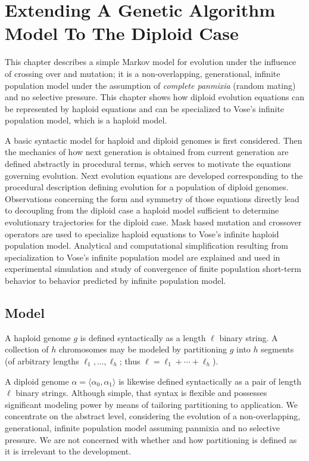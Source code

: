 \chapter{Extending A Genetic Algorithm Model To The Diploid Case} \label{ch:GA model Diploid}

This chapter describes a simple Markov model for evolution under the
influence of crossing over and mutation; it is a non-overlapping,
generational, infinite population model under the assumption of {\em complete panmixia} (random mating) and no
selective pressure. This chapter shows how diploid evolution equations can be represented by haploid equations 
and can be specialized to Vose's infinite population model, which is a haploid model.

A basic syntactic model for haploid and diploid genomes is first considered. 
Then the mechanics of how next generation is obtained from current generation are
defined abstractly in procedural terms, which serves to motivate the equations governing evolution. 
Next evolution equations are developed corresponding to the
procedural description defining evolution for a population of
diploid genomes. Observations concerning the form and symmetry of
those equations directly lead to decoupling from the diploid case a
haploid model sufficient to determine evolutionary trajectories for
the diploid case. Mask based mutation and crossover operators are used to specialize 
haploid equations to Vose's infinite haploid population model. 
Analytical and computational simplification resulting from specialization to 
Vose's infinite population model are explained and used 
in experimental simulation and study of convergence of finite population 
short-term behavior to behavior predicted by infinite population model.    

\section{Model} \label{Model}
A haploid genome $g$ is defined syntactically as a length $\ell$
binary string.  A collection of $h$ chromosomes may be modeled by
partitioning $g$ into $h$ segments (of arbitrary lengths $\ell_1,
\ldots , \ell_h$; thus $\ell = \ell_1 + \cdots + \ell_h$).

A diploid genome $\alpha = \langle \alpha_0, \alpha_1 \rangle$ is
likewise defined syntactically as a pair of length $\ell$ binary
strings.  Although simple, that syntax is flexible and possesses
significant modeling power by means of tailoring partitioning to
application.  We concentrate on the abstract level, considering the
evolution of a non-overlapping, generational, infinite population
model assuming panmixia and no selective pressure. We are not concerned with 
whether and how partitioning is defined as it is irrelevant 
to the development.

